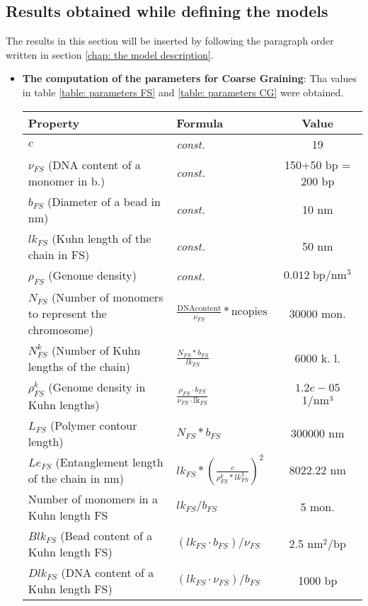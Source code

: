 \subsection{Results obtained while defining the models}
The results in this section will be inserted by following the paragraph order written in section \ref{chap: the model description}.
\begin{itemize}
    \item \textbf{The computation of the parameters for Coarse Graining}: Tha values in table \ref{table: parameters FS} and \ref{table: parameters CG} were obtained.

\begin{table}[H]

    \begin{tabular}{|l|l|c|}
    \hline
    \textbf{Property} & \textbf{Formula} & \textbf{Value}\\
    \hline
    \textbf{$c$} & \textit{const.} & 19\\
    \hline
    \textbf{$\nu_{FS}$} (DNA content of a monomer in b.) & \textit{const.} & 150+50 bp = 200 bp\\
    \hline
    \textbf{$b_{FS}$} (Diameter of a bead in nm) & \textit{const.} & 10 nm\\
    \hline
    \textbf{$lk_{FS}$} (Kuhn length of the chain  in FS) & \textit{const.} & 50 nm \\
    \hline
    \textbf{$\rho_{FS}$} (Genome density) &\textit{const.} & $0.012\; \text{bp}/\text{nm}^3$\cite{golkaramRoleChromatinDensity2017} \\ 
    \hline
    \textbf{$N_{FS}$} (Number of monomers to represent the chromosome) & $\frac{\text{DNAcontent}}{\nu_{FS}} * \text{ncopies}$ & 30000 mon.\\
    \hline
    \textbf{$N^k_{FS}$} (Number of Kuhn lengths of the chain) & $\frac{N_{FS} * b_{FS}}{lk_{FS}}$ & 6000 k. l.\\
    \hline
    \textbf{$\rho^k_{FS}$} (Genome density in Kuhn lengths) & $\frac{\rho_{FS} \cdot b_{FS}}{\nu_{FS} \cdot \text{lk}_{FS}}$& $1.2e-05$ 1/nm³\\
    \hline
    \textbf{$L_{FS}$} (Polymer contour length) & $N_{FS} * b_{FS}$ & 300000 nm\\
    \hline
    \textbf{$Le_{FS}$} (Entanglement length of the chain in nm) & $lk_{FS} * \left(\frac{c}{\rho^k_{FS} * lk_{FS}^3}\right)^2$ & 8022.22 nm\\
    \hline
    Number of monomers in a Kuhn length FS & $lk_{FS}/b_{FS}$ & 5 mon.\\
    \hline
    $Blk_{FS}$ (Bead content of a Kuhn length FS) & $(lk_{FS} \cdot b_{FS})/\nu_{FS}$ & 2.5 $\text{nm}^2$/bp  \\
    \hline
    $Dlk_{FS}$ (DNA content of a Kuhn length FS) & $(lk_{FS} \cdot \nu_{FS})/b_{FS}$ & 1000 $\text{bp}$\\
    \hline
    

\end{tabular}
\end{table}
\end{itemize}
